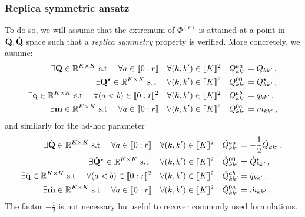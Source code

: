 			\subsubsection{Replica symmetric ansatz}
			To do so, we will assume that the extremum of $\Phi^{(r)}$ is attained at a point in ${\mathbf{Q}},\hat{{\mathbf{Q}}}$ space such that a \emph{replica symmetry} property is verified. More concretely, we assume: 
			\begin{align}
			\begin{aligned}
			\exists {\mathbf{Q}} \in \mathbb{R}^{K \times K} \text{ s.t } \quad \forall a \in \llbracket 0 : r \rrbracket \quad \forall (k,k') \in \llbracket K \rrbracket^2 \quad Q^{a a}_{k k'} &= Q_{k k'}\,,\\
			\exists {\mathbf{Q}}^\star \in \mathbb{R}^{K \times K} \text{ s.t } \quad \forall (k,k') \in \llbracket K \rrbracket^2 \quad Q^{0 0}_{k k'} &= Q^\star_{k k'}\,,\\
			\exists {\mathbf{q}} \in \mathbb{R}^{K \times K} \text{ s.t } \quad \forall (a < b) \in \llbracket 0 : r \rrbracket^2 \quad \forall (k,k') \in \llbracket K \rrbracket^2 \quad Q^{a b}_{k k'} &= q_{k k'}\,,\\
			\exists {\mathbf{m}} \in \mathbb{R}^{K \times K} \text{ s.t } \quad \forall a \in \llbracket 0 : r\rrbracket \quad \forall (k,k') \in \llbracket K \rrbracket^2 \quad Q^{0 a}_{k k'} &= m_{k k'}\,,
			\end{aligned}
			\end{align}
			and similarly for the ad-hoc parameter
			\begin{align}
			\begin{aligned}
			\exists \hat{{\mathbf{Q}}} \in \mathbb{R}^{K \times K} \text{ s.t } \quad \forall a \in \llbracket 0 : r \rrbracket \quad \forall (k,k') \in \llbracket K \rrbracket^2 \quad \hat{Q}^{a a}_{k k'} &= -\frac{1}{2} \hat{Q}_{k k'}\,,\\
			\exists \hat{{\mathbf{Q}}}^\star \in \mathbb{R}^{K \times K} \text{ s.t } \quad \forall (k,k') \in \llbracket K \rrbracket^2 \quad \hat{Q}^{0 0}_{k k'} &= \hat{Q}^\star_{k k'}\,, \\
			\exists \hat{{\mathbf{q}}} \in \mathbb{R}^{K \times K} \text{ s.t } \quad \forall (a < b) \in \llbracket 0 : r \rrbracket^2 \quad \forall (k,k') \in \llbracket K \rrbracket^2 \quad \hat{Q}^{a b}_{k k'} &= \hat{q}_{k k'}\,, \\
			\exists \hat{{\mathbf{m}}} \in \mathbb{R}^{K \times K} \text{ s.t } \quad \forall a \in \llbracket 0 : r \rrbracket \quad \forall (k,k') \in \llbracket K \rrbracket^2 \quad \hat{Q}^{0 a}_{k k'} &= \hat{m}_{k k'}\,.
			\end{aligned}\
			\end{align} 
			The factor $-\frac{1}{2}$ is not necessary bu useful to recover commonly used formulations.
